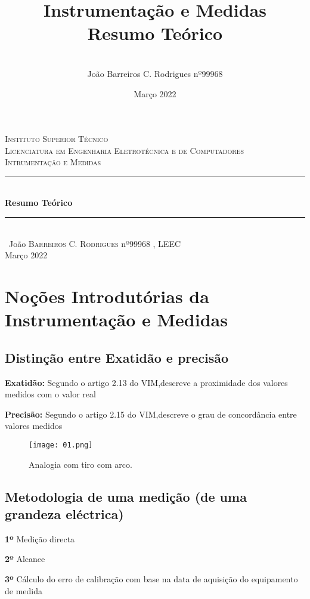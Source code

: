 \documentclass[a4paper,12pt]{article}
\date{Março 2022}
\title{Instrumentação e Medidas \\ \large {Resumo Teórico}}
\author{
\\ João Barreiros C. Rodrigues nº99968
}
\begin{document}
	\begin{titlepage} %
        \newcommand{\HRule}{\rule{\linewidth}{0.5mm}} %
        \center %
        \textsc{\LARGE Instituto Superior Técnico}\\[1.5cm] %
	\textsc{\Large Licenciatura em Engenharia Eletrotécnica e de Computadores}\\[0.25cm]
        \textsc{\Large Intrumentação e Medidas}\\[0.5cm] %
        \HRule\\[0.4cm]
        {\huge\bfseries Resumo Teórico}\\[0.4cm] %
        \HRule\\[1.5cm]\
        João \textsc{Barreiros C. Rodrigues} nº99968 , LEEC\\
	\vfill\vfill\vfill %
        {\large Março 2022} %
        \vfill %
\end{titlepage}
	\newpage
		\tableofcontents
	\newpage
	\section{Noções Introdutórias da Instrumentação e Medidas}
		\subsection{Distinção entre Exatidão e precisão}
			\par
			\textbf{Exatidão:} Segundo o artigo 2.13 do VIM,descreve a proximidade dos valores medidos com o valor real \par
			\textbf{Precisão:} Segundo o artigo 2.15 do VIM,descreve o grau de concordância entre valores medidos\par

			\begin{figure}[h]
				\centering
					\captionsetup{justification=centering}
					\texttt{[image: 01.png]}
					\caption{Analogia com tiro com arco.}
			\end{figure}
		\subsection{Metodologia de uma medição (de uma grandeza eléctrica)}
			\par
			\textbf{1º} Medição directa \par
			\textbf{2º} Alcance \par
			\textbf{3º} Cálculo do erro de calibração com base na data de aquisição do equipamento de medida
\end{document}
